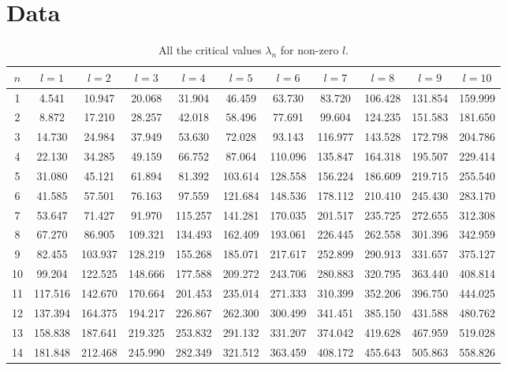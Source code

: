 \documentclass[12pt,twoside]{reedthesis}
\begin{document}
\chapter{Data}
\begin{table}[h]
\scriptsize
\begin{adjustwidth}{-0.5in}{-0.5in}
	\caption{All the critical values $\lambda_n$ for non-zero $l$.}
	\label{tab:alldata}
	\begin{tabular}{c|cccccccccc}
		$n$	& $l = 1$	& $l = 2$	& $l = 3$	& $l = 4$	& $l = 5$	& $l = 6$	& $l = 7$	& $l = 8$	& $l = 9$	& $l = 10$\\
		\hline
		1	& 4.541	& 10.947	& 20.068	& 31.904	& 46.459	& 63.730	& 83.720	& 106.428	& 131.854	& 159.999\\
		2	& 8.872	& 17.210	& 28.257	& 42.018	& 58.496	& 77.691	& 99.604	& 124.235	& 151.583	& 181.650\\
		3	& 14.730	& 24.984	& 37.949	& 53.630	& 72.028	& 93.143	& 116.977	& 143.528	& 172.798	& 204.786\\
		4	& 22.130	& 34.285	& 49.159	& 66.752	& 87.064	& 110.096	& 135.847	& 164.318	& 195.507	& 229.414\\
		5	& 31.080	& 45.121	& 61.894	& 81.392	& 103.614	& 128.558	& 156.224	& 186.609	& 219.715	& 255.540\\
		6	& 41.585	& 57.501	& 76.163	& 97.559	& 121.684	& 148.536	& 178.112	& 210.410	& 245.430	& 283.170\\
		7	& 53.647	& 71.427	& 91.970	& 115.257	& 141.281	& 170.035	& 201.517	& 235.725	& 272.655	& 312.308\\
		8	& 67.270	& 86.905	& 109.321	& 134.493	& 162.409	& 193.061	& 226.445	& 262.558	& 301.396	& 342.959\\
		9	& 82.455	& 103.937	& 128.219	& 155.268	& 185.071	& 217.617	& 252.899	& 290.913	& 331.657	& 375.127\\
		10	& 99.204	& 122.525	& 148.666	& 177.588	& 209.272	& 243.706	& 280.883	& 320.795	& 363.440	& 408.814\\
		11	& 117.516	& 142.670	& 170.664	& 201.453	& 235.014	& 271.333	& 310.399	& 352.206	& 396.750	& 444.025\\
		12	& 137.394	& 164.375	& 194.217	& 226.867	& 262.300	& 300.499	& 341.451	& 385.150	& 431.588	& 480.762\\
		13	& 158.838	& 187.641	& 219.325	& 253.832	& 291.132	& 331.207	& 374.042	& 419.628	& 467.959	& 519.028\\
		14	& 181.848	& 212.468	& 245.990	& 282.349	& 321.512	& 363.459	& 408.172	& 455.643	& 505.863	& 558.826\\

\end{tabular}
\end{adjustwidth}
\end{table}
\end{document}
